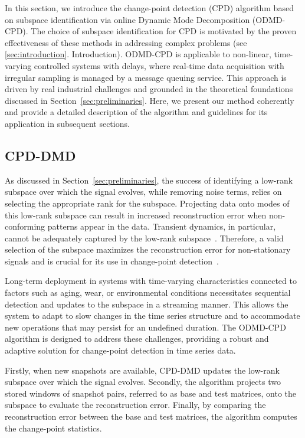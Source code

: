 In this section, we introduce the change-point detection (CPD) algorithm based on subspace identification via online Dynamic Mode Decomposition (ODMD-CPD). The choice of subspace identification for CPD is motivated by the proven effectiveness of these methods in addressing complex problems (see \ref{sec:introduction}. Introduction). ODMD-CPD is applicable to non-linear, time-varying controlled systems with delays, where real-time data acquisition with irregular sampling is managed by a message queuing service. This approach is driven by real industrial challenges and grounded in the theoretical foundations discussed in Section~\ref{sec:preliminaries}. Here, we present our method coherently and provide a detailed description of the algorithm and guidelines for its application in subsequent sections.

\subsection{CPD-DMD}
As discussed in Section~\ref{sec:preliminaries}, the success of identifying a low-rank subspace over which the signal evolves, while removing noise terms, relies on selecting the appropriate rank for the subspace. Projecting data onto modes of this low-rank subspace can result in increased reconstruction error when non-conforming patterns appear in the data. Transient dynamics, in particular, cannot be adequately captured by the low-rank subspace~\citep{Kuehn2011, Gottwald2020}. Therefore, a valid selection of the subspace maximizes the reconstruction error for non-stationary signals and is crucial for its use in change-point detection~\citep{Moskvina2003}.

Long-term deployment in systems with time-varying characteristics connected to factors such as aging, wear, or environmental conditions necessitates sequential detection and updates to the subspace in a streaming manner. This allows the system to adapt to slow changes in the time series structure and to accommodate new operations that may persist for an undefined duration. The ODMD-CPD algorithm is designed to address these challenges, providing a robust and adaptive solution for change-point detection in time series data.

Firstly, when new snapshots are available, CPD-DMD updates the low-rank subspace over which the signal evolves. Secondly, the algorithm projects two stored windows of snapshot pairs, referred to as base and test matrices, onto the subspace to evaluate the reconstruction error. Finally, by comparing the reconstruction error between the base and test matrices, the algorithm computes the change-point statistics.

